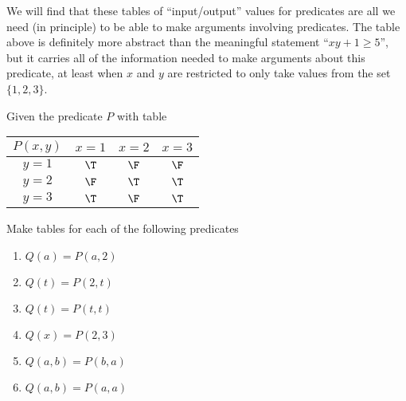 We will find that these tables of ``input/output'' values for predicates are all we need (in principle) to be able to make arguments involving predicates.  The table above is definitely more abstract than the meaningful statement ``$xy + 1 \geq  5$'', but it carries all of the information needed to make arguments about this predicate, at least when $x$ and $y$ are restricted to only take values from the set $\{1,2,3\}$.

\begin{xca}
	Given the predicate $P$ with table
	
		\begin{table}[h!]
		\begin{center}
			\begin{tabular}{c|c|c|c|}
				$ P(x,y)$        &$x=1$ & $x=2$ & $x=3$  \\
				\hline
				$y=1$ &    $\T$      &     $\F$      & $\F$        \\
				\hline
				$y=2$ &    $\F$      &     $\T$      & $\T$        \\
				\hline
				$y=3$ &    $\T$      &     $\F$      & $\T$        \\
				\hline
			\end{tabular}
		\end{center}
	\end{table}

	Make tables for each of the following predicates
	
	\begin{enumerate}
			\item $Q(a) = P(a,2)$
			\item $Q(t) = P(2,t)$
			\item $Q(t) = P(t,t)$
			\item $Q(x) = P(2,3)$
			\item $Q(a,b) = P(b,a)$
			\item $Q(a,b) = P(a,a)$
		\end{enumerate}

	\end{xca}

